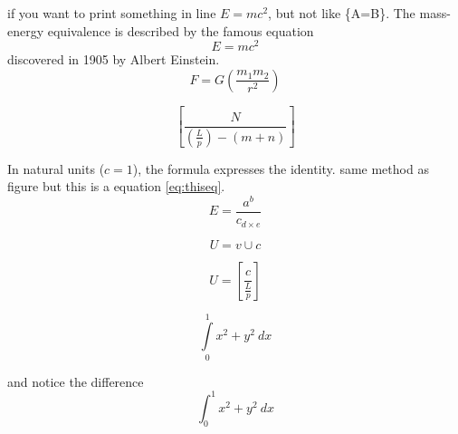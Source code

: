 \documentclass[12pt, letterpaper]{article}
\begin{document}
if you want to print something in line \(E=mc^2\), but not like \{A=B\}. 
The mass-energy equivalence is described by the famous equation
\[ E=mc^2 \] discovered in 1905 by Albert Einstein. 
\[ 
F = G \left( \frac{m_1 m_2}{r^2} \right)
\]


\[ 
 \left[  \frac{ N } { \left( \frac{L}{p} \right)  - (m+n) }  \right]
\]




In natural units ($c = 1$), the formula expresses the identity. same method as figure but this is a equation \ref{eq:thiseq}.
\begin{equation}
E= \frac{a^b}{c_{d \times e} } 
\label{eq:thiseq}
\end{equation}

\begin{equation}
    \label{eq:1}
    U= v \cup c
\end{equation}

\begin{equation}
    \label{eq:3}
    U= \left[ \frac{c}{ \frac{L}{p}} \right]  
\end{equation}




\[ \int\limits_0^1 x^2 + y^2 \ dx \]



and notice the difference \[ \int_0^1 x^2 + y^2 \ dx \]
\end{document}
